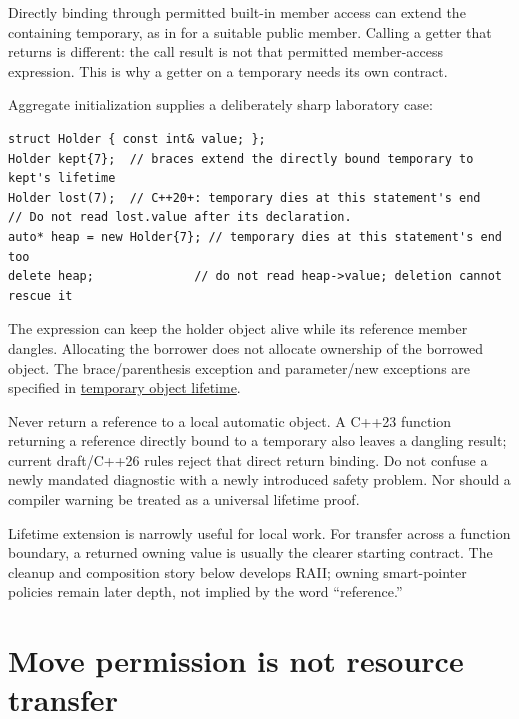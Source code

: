 Directly binding through permitted built-in member access can extend the containing temporary, as in  for a suitable public  member. Calling a getter that returns  is different: the call result is not that permitted member-access expression. This is why a getter on a temporary needs its own contract.

Aggregate initialization supplies a deliberately sharp laboratory case:

\begin{verbatim}
struct Holder { const int& value; };
Holder kept{7};  // braces extend the directly bound temporary to kept's lifetime
Holder lost(7);  // C++20+: temporary dies at this statement's end
// Do not read lost.value after its declaration.
auto* heap = new Holder{7}; // temporary dies at this statement's end too
delete heap;              // do not read heap->value; deletion cannot rescue it
\end{verbatim}

The  expression can keep the holder object alive while its reference member dangles. Allocating the borrower does not allocate ownership of the borrowed object. The brace/parenthesis exception and parameter/new exceptions are specified in \href{https://eel.is/c++draft/class.temporary}{temporary object lifetime}.

Never return a reference to a local automatic object. A C++23 function returning a reference directly bound to a temporary also leaves a dangling result; current draft/C++26 rules reject that direct return binding. Do not confuse a newly mandated diagnostic with a newly introduced safety problem. Nor should a compiler warning be treated as a universal lifetime proof.

Lifetime extension is narrowly useful for local work. For transfer across a function boundary, a returned owning value is usually the clearer starting contract. The cleanup and composition story below develops RAII; owning smart-pointer policies remain later depth, not implied by the word ``reference.''

\section{Move permission is not resource transfer}\label{05-engine-i-ch003-move-permission-is-not-resource-transfer}

